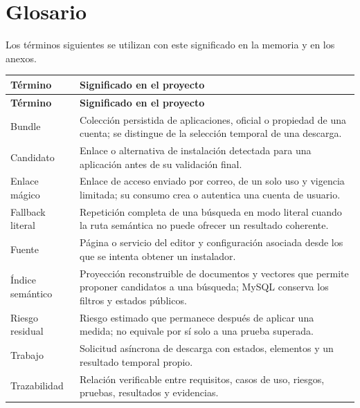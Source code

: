 \chapter*{Glosario}

Los términos siguientes se utilizan con este significado en la memoria y en los anexos.

\begin{longtable}{p{}p{}}
\toprule
\textbf{Término} & \textbf{Significado en el proyecto}\\
\midrule
\endfirsthead
\toprule
\textbf{Término} & \textbf{Significado en el proyecto}\\
\midrule
\endhead
\bottomrule
\endlastfoot
Bundle & Colección persistida de aplicaciones, oficial o propiedad de una cuenta; se distingue de la selección temporal de una descarga.\\
Candidato & Enlace o alternativa de instalación detectada para una aplicación antes de su validación final.\\
Enlace mágico & Enlace de acceso enviado por correo, de un solo uso y vigencia limitada; su consumo crea o autentica una cuenta de usuario.\\
Fallback literal & Repetición completa de una búsqueda en modo literal cuando la ruta semántica no puede ofrecer un resultado coherente.\\
Fuente & Página o servicio del editor y configuración asociada desde los que se intenta obtener un instalador.\\
Índice semántico & Proyección reconstruible de documentos y vectores que permite proponer candidatos a una búsqueda; MySQL conserva los filtros y estados públicos.\\
Riesgo residual & Riesgo estimado que permanece después de aplicar una medida; no equivale por sí solo a una prueba superada.\\
Trabajo & Solicitud asíncrona de descarga con estados, elementos y un resultado temporal propio.\\
Trazabilidad & Relación verificable entre requisitos, casos de uso, riesgos, pruebas, resultados y evidencias.\\
\end{longtable}
